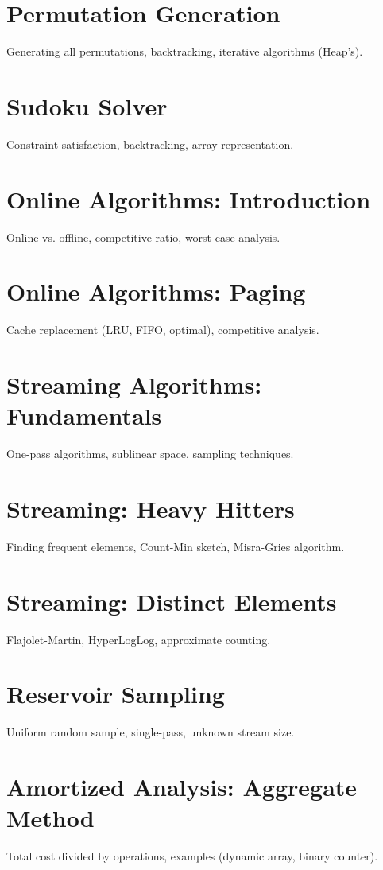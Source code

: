 \chapter{Permutation Generation}
Generating all permutations, backtracking, iterative algorithms (Heap's).

\chapter{Sudoku Solver}
Constraint satisfaction, backtracking, array representation.


\chapter{Online Algorithms: Introduction}
Online vs. offline, competitive ratio, worst-case analysis.

\chapter{Online Algorithms: Paging}
Cache replacement (LRU, FIFO, optimal), competitive analysis.

\chapter{Streaming Algorithms: Fundamentals}
One-pass algorithms, sublinear space, sampling techniques.

\chapter{Streaming: Heavy Hitters}
Finding frequent elements, Count-Min sketch, Misra-Gries algorithm.

\chapter{Streaming: Distinct Elements}
Flajolet-Martin, HyperLogLog, approximate counting.

\chapter{Reservoir Sampling}
Uniform random sample, single-pass, unknown stream size.

\chapter{Amortized Analysis: Aggregate Method}
Total cost divided by operations, examples (dynamic array, binary counter).

